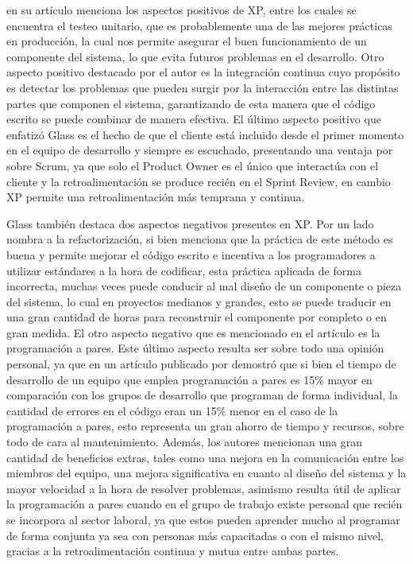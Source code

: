 \documentclass[a4paper,10pt]{article}
\begin{document}
	\textcite{glass2001extreme} en su artículo menciona los aspectos positivos de XP, entre los cuales se encuentra el testeo unitario, que es probablemente una de las mejores prácticas en producción, la cual nos permite asegurar el buen funcionamiento de un componente del sistema, lo que evita futuros problemas en el desarrollo. Otro aspecto positivo destacado por el autor es la integración continua cuyo propósito es detectar los problemas que pueden surgir por la interacción entre las distintas partes que componen el sistema, garantizando de esta manera que el código escrito se puede combinar de manera efectiva. El último aspecto positivo que enfatizó Glass es el hecho de que el cliente está incluido desde el primer momento en el equipo de desarrollo y siempre es escuchado, presentando una ventaja por sobre Scrum, ya que solo el Product Owner es el único que interactúa con el cliente y la retroalimentación se produce recién en el Sprint Review, en cambio XP permite una retroalimentación más temprana y continua.
	
	Glass también destaca dos aspectos negativos presentes en XP. Por un lado nombra a la refactorización, si bien menciona que la práctica de este método es buena y permite mejorar el código escrito e incentiva a los programadores a utilizar estándares a la hora de codificar, esta práctica aplicada de forma incorrecta, muchas veces puede conducir al mal diseño de un componente o pieza del sistema, lo cual en proyectos medianos y grandes, esto se puede traducir en una gran cantidad de horas para reconstruir el componente por completo o en gran medida. El otro aspecto negativo que es mencionado en el artículo es la programación a pares. Este último aspecto  resulta ser sobre todo una opinión personal, ya que en un artículo publicado por \textcite{cockburn2000costs} demostró que si bien el tiempo de desarrollo de un equipo que emplea programación a pares es 15\% mayor en comparación con los grupos de desarrollo que programan de forma individual, la cantidad de errores en el código eran un 15\% menor en el caso de la programación a pares, esto representa un gran ahorro de tiempo y recursos, sobre todo de cara al mantenimiento. Además, los autores mencionan una gran cantidad de beneficios extras, tales como una mejora en la comunicación entre los miembros del equipo, una mejora significativa en cuanto al diseño del sistema y la mayor velocidad a la hora de resolver problemas, asimismo resulta útil de aplicar la programación a pares cuando en el grupo de trabajo existe personal que recién se incorpora al sector laboral, ya que estos pueden aprender mucho al programar de forma conjunta ya sea con personas más capacitadas o con el mismo nivel, gracias a la retroalimentación continua y mutua entre ambas partes.
\end{document}
